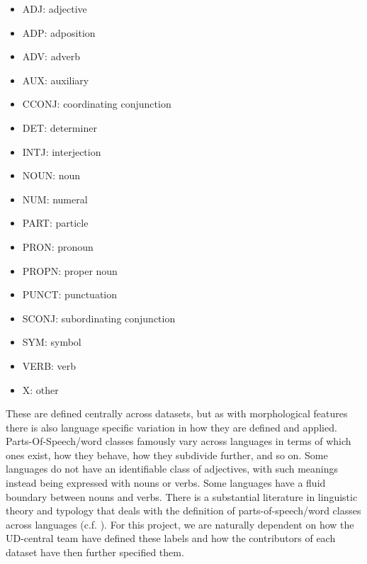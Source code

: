 \documentclass[USenglish]{article}
\begin{document}
\begin{itemize}
    \item ADJ: adjective
    \item ADP: adposition
    \item ADV: adverb
    \item AUX: auxiliary
    \item CCONJ: coordinating conjunction
    \item DET: determiner
    \item INTJ: interjection
    \item NOUN: noun
    \item NUM: numeral
    \item PART: particle
    \item PRON: pronoun
    \item PROPN: proper noun
    \item PUNCT: punctuation
    \item SCONJ: subordinating conjunction
    \item SYM: symbol
    \item VERB: verb
    \item X: other
\end{itemize}

These are defined centrally across datasets, but as with morphological features there is also language specific variation in how they are defined and applied. 
Parts-Of-Speech/word classes famously vary across languages in terms of which ones exist, how they behave, how they subdivide further, and so on. 
Some languages do not have an identifiable class of adjectives, with such meanings instead being expressed with nouns or verbs. 
Some languages have a fluid boundary between nouns and verbs. 
There is a substantial literature in linguistic theory and typology that deals with the definition of parts-of-speech/word classes across languages (c.f. \citet{kira_keira}).
For this project, we are naturally dependent on how the UD-central team have defined these labels and how the contributors of each dataset have then further specified them.
\end{document}
